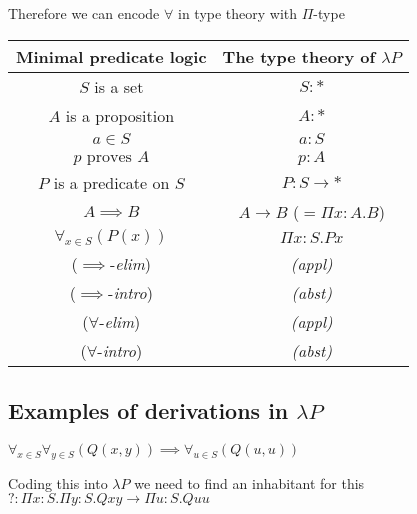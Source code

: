 \documentclass[12pt, a4paper]{article}
\begin{document}
 Therefore we can encode $\forall$ in type theory with $\Pi$-type

 \begin{center}
    \begin{tabular}{| c | c |} 
     \hline
     Minimal predicate logic & The type theory of $\lambda P$ \\
     \hline
     \hline
     $S$ is a set & $S : *$\\
     $A$ is a proposition & $A : *$\\
    \hline
    $a \in S$ & $a : S$\\
    $p \text{ proves } A$ & $p : A$\\
    \hline
    $P$ is a predicate on $S$ & $P : S \to *$\\
    \hline
    \hline
    $A \implies B$ & $A \to B$ ($= \Pi x: A . B$)\\
    $\forall_{x \in S}(P(x))$ & $\Pi x: S . Px$\\
    \hline
    \hline
    ($\implies$-\textit{elim}) & \textit{(appl)}\\
    ($\implies$-\textit{intro}) & \textit{(abst)}\\
    \hline
    ($\forall$-\textit{elim}) & \textit{(appl)}\\
    ($\forall$-\textit{intro}) & \textit{(abst)}\\
    \hline
   \end{tabular}
\end{center}

\subsection{Examples of derivations in \texorpdfstring{$\lambda P$}{}}

$\forall_{x \in S}\forall_{y \in S}(Q(x,y)) \implies \forall_{u \in S}(Q(u,u))$

\begin{flagderiv}
\end{flagderiv}

Coding this into $\lambda P$ we need to find an inhabitant for this $? : \Pi x  : S. \Pi y : S. Qxy \to \Pi u : S. Quu$
\end{document}

